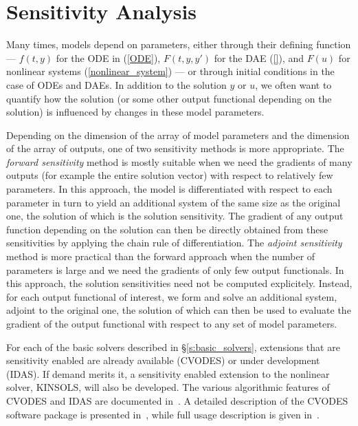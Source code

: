 \section{Sensitivity Analysis}
\label{s:sensitivity_analysis}

Many times, models depend on parameters, either through their defining
function --- $f(t,y)$ for the ODE in (\ref{ODE}), $F(t,y,y')$ for the DAE
(\ref{}), and $F(u)$ for nonlinear systems (\ref{nonlinear_system}) 
--- or through initial conditions in the case of ODEs and DAEs. 
In addition to the solution $y$ or $u$, we often want to quantify how 
the solution (or some other output functional depending on the solution) 
is influenced by changes in these model parameters.

Depending on the dimension of the array of model parameters and the
dimension of the array of outputs, one of two sensitivity methods
is more appropriate. 
%
The {\em forward sensitivity} method is mostly suitable when we need 
the gradients of many outputs (for example the entire solution vector) 
with respect to relatively few parameters.
In this approach, the model is differentiated with respect to each 
parameter in turn to yield an additional system of the same size as
the original one, the solution of which is the solution sensitivity.
The gradient of any output function depending on the solution can
then be directly obtained from these sensitivities by applying the
chain rule of differentiation.
%
The {\em adjoint sensitivity} method is more practical than
the forward approach when the number of parameters is large and
we need the gradients of only few output functionals.
In this approach, the solution sensitivities need not be computed
explicitely. Instead, for each output functional of interest, we form
and solve an additional system, adjoint to the original one, the 
solution of which can then be used to evaluate the gradient of the
output functional with respect to any set of model parameters.

For each of the basic solvers described in \S\ref{s:basic_solvers},
extensions that are sensitivity enabled are already available (CVODES)
or under development (IDAS). If demand merits it, a sensitivity
enabled extension to the nonlinear solver, KINSOLS, will also be
developed.
The various algorithmic features of CVODES and IDAS are documented 
in~\cite{CLPS:03}. A detailed description of the CVODES software package 
is presented in~\cite{SeHi:03}, while full usage description is given
in~\cite{HiSe:02}.
%

